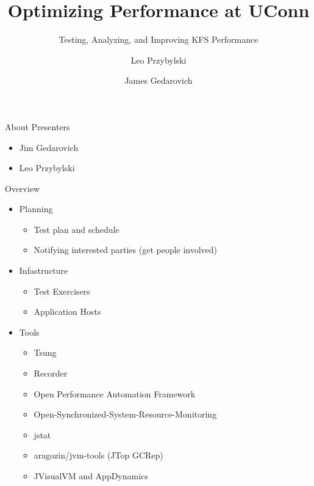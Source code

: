 \documentclass[xcolor=dvipsnames,14pt]{beamer}
\begin{document}
\title[A short proof]{Optimizing Performance at UConn}
\subtitle[Errors]{Testing, Analyzing, and Improving KFS Performance}
\author[Leo]{Leo Przybylski  \and James Gedarovich }



\begin{frame}[plain]
  \titlepage
\end{frame}

\begin{frame}{About Presenters}
  \begin{itemize}
    \item Jim Gedarovich
    \item Leo Przybylski
  \end{itemize}
\end{frame}

\begin{frame}{Overview}
  \begin{itemize}
    \item Planning
    \begin{itemize}
      \item Test plan and schedule
      \item Notifying interested parties (get people involved)
    \end{itemize}
    \item Infastructure 
      \begin{itemize}
        \item Test Exercisers
        \item Application Hosts
      \end{itemize}
    \item Tools 
      \begin{itemize}
        \item Tsung
        \item Recorder
        \item Open Performance Automation Framework
        \item Open-Synchronized-System-Resource-Monitoring
        \item jstat
        \item aragozin/jvm-tools (JTop GCRep)
        \item JVisualVM and AppDynamics
      \end{itemize}
  \end{itemize}
\end{frame}
\end{document}
